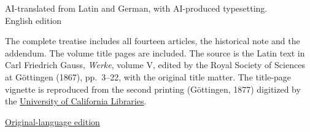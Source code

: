 \begin{center}
\smallskip
AI-translated from Latin and German, with AI-produced typesetting.\\English edition
\end{center}
\clearpage
\begingroup\small
\medskip
\noindent The complete treatise includes all fourteen articles, the historical note and the addendum. The volume title pages are included. The source is the Latin text in Carl Friedrich Gauss, \textit{Werke}, volume V, edited by the Royal Society of Sciences at Göttingen (1867), pp.~3--22, with the original title matter. The title-page vignette is reproduced from the second printing (Göttingen, 1877) digitized by the \href{https://archive.org/details/Werkecarlf05gausrich/page/n8/mode/1up}{University of California Libraries}.
\par\medskip
\noindent \href{https://github.com/KokunoYumeto/gauss-collected-works/releases/tag/gauss-original-language-2026-10-24}{Original-language edition}
\par\medskip
